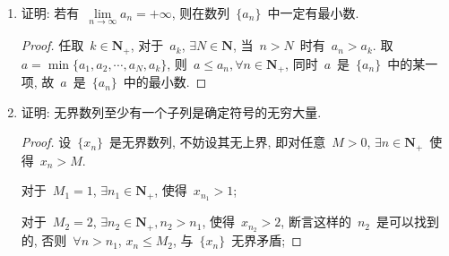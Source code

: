 \documentclass[UTF8,a4paper,11pt,twoside]{book}
\begin{document}
\begin{enumerate}
\begin{proof}
		      举一个无最小数的例子: $x_n=1+1/n, n\in\mathbf{N}_{+}$.\qedhere
	      \end{proof}
	\item 证明: 若有~$\lim\limits_{n\to\infty} a_n=+\infty$, 则在数列~$\{a_n\}$~中一定有最小数.
	      \begin{proof}
		      任取~$k\in\mathbf{N}_{+}$, 对于~$a_k$, $\exists N\in\mathbf{N}$, 当~$n>N$~时有~$a_n>a_k$. 取~$a=\min\{a_1,a_2,\cdots,a_N,a_k\}$, 则~$a\leqslant a_n, \forall n\in\mathbf{N}_{+}$, 同时~$a$~是~$\{a_n\}$~中的某一项, 故~$a$~是~$\{a_n\}$~中的最小数.\qedhere
	      \end{proof}
	\item 证明: 无界数列至少有一个子列是确定符号的无穷大量.
	      \begin{proof}
		      设~$\{x_n\}$~是无界数列, 不妨设其无上界, 即对任意~$M>0$, $\exists n\in\mathbf{N}_{+}$~使得~$x_n>M$.

		      对于~$M_1=1$, $\exists n_1\in\mathbf{N}_{+}$, 使得~$x_{n_1}>1$;

		      对于~$M_2=2$, $\exists n_2\in\mathbf{N}_{+}, n_2>n_1$, 使得~$x_{n_2}>2$, 断言这样的~$n_2$~是可以找到的, 否则~$\forall n>n_1$, $x_n\leqslant M_2$, 与~$\{x_n\}$~无界矛盾;


\end{proof}
\end{enumerate}
\end{document}
